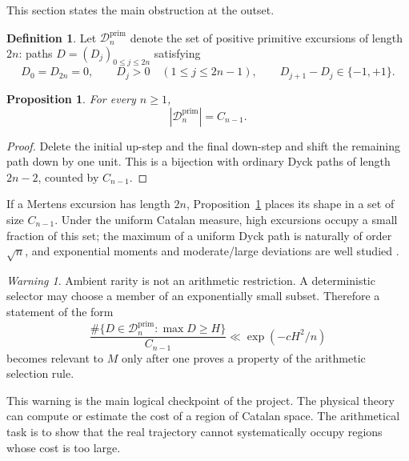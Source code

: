 \documentclass[11pt]{amsart}
\numberwithin{equation}{section}
\theoremstyle{plain}
\newtheorem{proposition}[theorem]{Proposition}
\theoremstyle{definition}
\newtheorem{definition}[theorem]{Definition}
\theoremstyle{remark}
\newtheorem{warning}[theorem]{Warning}
\newcommand{\Mert}{M}
\newcommand{\Cat}{C}
\newcommand{\D}{\mathcal{D}}
\begin{document}
This section states the main obstruction at the outset.

\begin{definition}
\label{def:catalan_excursion_space}
Let $\D_n^{\mathrm{prim}}$ denote the set of positive primitive excursions of length $2n$: paths $D=(D_j)_{0\le j\le 2n}$ satisfying
\begin{equation}
D_0=D_{2n}=0,
\qquad
D_j>0 \quad (1\le j\le 2n-1),
\qquad
D_{j+1}-D_j\in\{-1,+1\}.
\label{eq:primitive_dyck_definition}
\end{equation}
\end{definition}

\begin{proposition}
\label{prop:primitive_catalan_cardinality}
For every $n\ge1$,
\begin{equation}
\left|\D_n^{\mathrm{prim}}\right|=\Cat_{n-1}.
\label{eq:primitive_catalan_cardinality}
\end{equation}
\end{proposition}

\begin{proof}
Delete the initial up-step and the final down-step and shift the remaining path down by one unit.  This is a bijection with ordinary Dyck paths of length $2n-2$, counted by $\Cat_{n-1}$.
\end{proof}

If a Mertens excursion has length $2n$, Proposition~\ref{prop:primitive_catalan_cardinality} places its shape in a set of size $\Cat_{n-1}$.  Under the uniform Catalan measure, high excursions occupy a small fraction of this set; the maximum of a uniform Dyck path is naturally of order $\sqrt n$, and exponential moments and moderate/large deviations are well studied \cite{KhorunzhiyMarckert2009,Kousha2012}.

\begin{warning}
\label{warn:rarity_not_selection}
Ambient rarity is not an arithmetic restriction.  A deterministic selector may choose a member of an exponentially small subset.  Therefore a statement of the form
\begin{equation}
\frac{\#\{D\in\D_n^{\mathrm{prim}}:\max D\ge H\}}
{\Cat_{n-1}}
\ll \exp\!\left(-cH^2/n\right)
\label{eq:ambient_rarity_only}
\end{equation}
becomes relevant to $\Mert$ only after one proves a property of the arithmetic selection rule.
\end{warning}

This warning is the main logical checkpoint of the project.  The physical theory can compute or estimate the cost of a region of Catalan space.  The arithmetical task is to show that the real trajectory cannot systematically occupy regions whose cost is too large.
\end{document}
